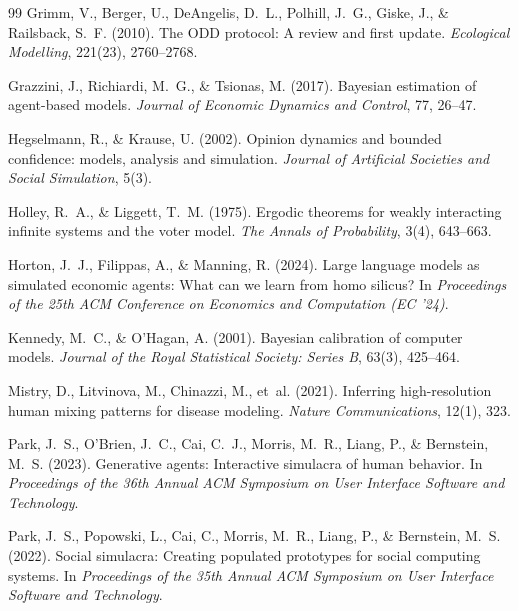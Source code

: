 \documentclass[12pt]{article}
\begin{document}
\begin{thebibliography}{99}
Grimm, V., Berger, U., DeAngelis, D.~L., Polhill, J.~G., Giske, J., \& Railsback, S.~F. (2010).
\newblock The ODD protocol: A review and first update.
\newblock \textit{Ecological Modelling}, 221(23), 2760--2768.

Grazzini, J., Richiardi, M.~G., \& Tsionas, M. (2017).
\newblock Bayesian estimation of agent-based models.
\newblock \textit{Journal of Economic Dynamics and Control}, 77, 26--47.

Hegselmann, R., \& Krause, U. (2002).
\newblock Opinion dynamics and bounded confidence: models, analysis and simulation.
\newblock \textit{Journal of Artificial Societies and Social Simulation}, 5(3).

Holley, R.~A., \& Liggett, T.~M. (1975).
\newblock Ergodic theorems for weakly interacting infinite systems and the voter model.
\newblock \textit{The Annals of Probability}, 3(4), 643--663.

Horton, J.~J., Filippas, A., \& Manning, R. (2024).
\newblock Large language models as simulated economic agents: What can we learn from homo silicus?
\newblock In \textit{Proceedings of the 25th ACM Conference on Economics and Computation (EC '24)}.

Kennedy, M.~C., \& O'Hagan, A. (2001).
\newblock Bayesian calibration of computer models.
\newblock \textit{Journal of the Royal Statistical Society: Series B}, 63(3), 425--464.

Mistry, D., Litvinova, M., Chinazzi, M., et~al. (2021).
\newblock Inferring high-resolution human mixing patterns for disease modeling.
\newblock \textit{Nature Communications}, 12(1), 323.

Park, J.~S., O'Brien, J.~C., Cai, C.~J., Morris, M.~R., Liang, P., \& Bernstein, M.~S. (2023).
\newblock Generative agents: Interactive simulacra of human behavior.
\newblock In \textit{Proceedings of the 36th Annual ACM Symposium on User Interface Software and Technology}.

Park, J.~S., Popowski, L., Cai, C., Morris, M.~R., Liang, P., \& Bernstein, M.~S. (2022).
\newblock Social simulacra: Creating populated prototypes for social computing systems.
\newblock In \textit{Proceedings of the 35th Annual ACM Symposium on User Interface Software and Technology}.


\end{thebibliography}
\end{document}

